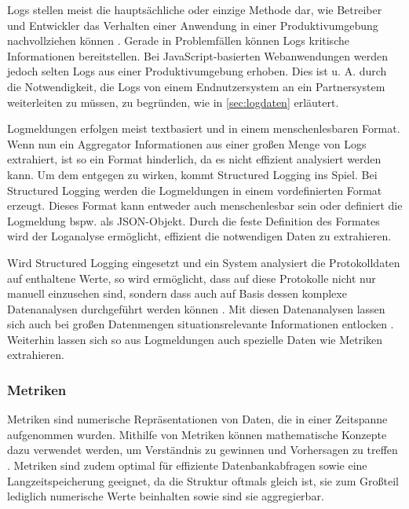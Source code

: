 Logs stellen meist die hauptsächliche oder einzige Methode dar, wie Betreiber und Entwickler das Verhalten einer Anwendung in einer Produktivumgebung nachvollziehen können \cite{EventLogsForTheAnalysisOfSoftwareFailures} \cite{LearningToLog}. Gerade in Problemfällen können Logs kritische Informationen bereitstellen. Bei JavaScript-basierten Webanwendungen werden jedoch selten Logs aus einer Produktivumgebung erhoben. Dies ist u. A. durch die Notwendigkeit, die Logs von einem Endnutzersystem an ein Partnersystem weiterleiten zu müssen, zu begründen, wie in \autoref{sec:logdaten} erläutert.

Logmeldungen erfolgen meist textbasiert und in einem menschenlesbaren Format. Wenn nun ein Aggregator Informationen aus einer großen Menge von Logs extrahiert, ist so ein Format hinderlich, da es nicht effizient analysiert werden kann. Um dem entgegen zu wirken, kommt Structured Logging ins Spiel. Bei Structured Logging \cite{StructuredAndInteroperableLogging} werden die Logmeldungen in einem vordefinierten Format erzeugt. Dieses Format kann entweder auch menschenlesbar sein oder definiert die Logmeldung bspw. als JSON-Objekt. Durch die feste Definition des Formates wird der Loganalyse ermöglicht, effizient die notwendigen Daten zu extrahieren.

Wird Structured Logging eingesetzt und ein System analysiert die Protokolldaten auf enthaltene Werte, so wird ermöglicht, dass auf diese Protokolle nicht nur manuell einzusehen sind, sondern dass auch auf Basis dessen komplexe Datenanalysen durchgeführt werden können \cite{StructuredAndInteroperableLogging}. Mit diesen Datenanalysen lassen sich auch bei großen Datenmengen situationsrelevante Informationen entlocken \cite{StructuredLoggingCraftingUsefulMessageContent}. Weiterhin lassen sich so aus Logmeldungen auch spezielle Daten wie Metriken extrahieren.

\subsubsection{Metriken}

Metriken sind numerische Repräsentationen von Daten, die in einer Zeitspanne aufgenommen wurden. Mithilfe von Metriken können mathematische Konzepte dazu verwendet werden, um Verständnis zu gewinnen und Vorhersagen zu treffen \cite{DistributedSystemsObservability}. Metriken sind zudem optimal für effiziente Datenbankabfragen sowie eine Langzeitspeicherung geeignet, da die Struktur oftmals gleich ist, sie zum Großteil lediglich numerische Werte beinhalten sowie sind sie aggregierbar.

